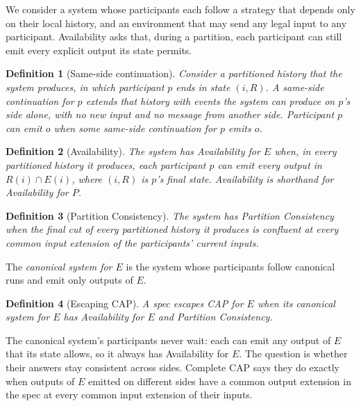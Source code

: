 \documentclass[sigconf]{cidr-2027}
\newtheorem{definition}{Definition}
\theoremstyle{remark}
\newcommand{\indesc}{input extension\xspace} %
\newcommand{\outnoun}{output extension\xspace}%
\begin{document}
We consider a system whose participants each follow a strategy that depends
only on their local history, and an environment that may send any legal input
to any participant.  Availability asks that, during a partition, each
participant can still emit every explicit output its state permits.

\begin{definition}[Same-side continuation]
\label{def:local-continuation}
Consider a partitioned history that the system produces, in which participant
$p$ ends in state $(i,R)$.  A \emph{same-side continuation} for $p$ extends that
history with events the system can produce on $p$'s side alone, with no new
input and no message from another side.  Participant $p$ can emit $o$ when some same-side continuation for $p$ emits
$o$.
\end{definition}

\begin{definition}[Availability]
\label{def:partition-notions}
The system has \emph{Availability for $E$} when, in every partitioned history
it produces, each participant $p$ can emit every output in $R(i)\cap E(i)$,
where $(i,R)$ is $p$'s final state.  \emph{Availability} is shorthand for
Availability for $P$.
\end{definition}

\begin{definition}[Partition Consistency]
\label{def:partition-consistency}
The system has \emph{Partition Consistency} when the final cut of every
partitioned history it produces is confluent at every common \indesc of the
participants' current inputs.
\end{definition}

The \emph{canonical system for $E$} is the system whose participants follow
canonical runs and emit only outputs of $E$.

\begin{definition}[Escaping CAP]
\label{def:escapes-cap}
A spec \emph{escapes CAP} for $E$ when its canonical system for $E$ has
Availability for $E$ and Partition Consistency.
\end{definition}

The canonical system's participants never wait: each can emit any output of
$E$ that its state allows, so it always has Availability for $E$.  The
question is whether their answers stay consistent across sides.  Complete CAP
says they do exactly when outputs of $E$ emitted on different sides have a
common \outnoun in the spec at every common \indesc of their inputs.
\end{document}
